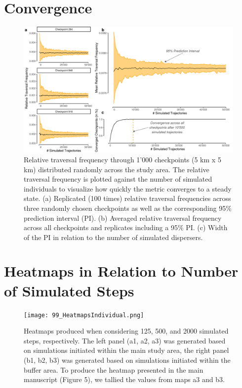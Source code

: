 \documentclass[abstract=off,10pt,a4paper,bibliography=totocnumbered]{article}
\begin{document}
\newpage
\section{Convergence}
\begin{figure}[htbp]
  \begin{center}
    \includegraphics[width=\textwidth]{99_Convergence}
    \caption{Relative traversal frequency through 1'000 checkpoints (5 km x 5
    km) distributed randomly across the study area. The relative traversal
    frequency is plotted against the number of simulated individuals to
    visualize how quickly the metric converges to a steady state. (a) Replicated
    (100 times) relative traversal frequencies across three randomly chosen
    checkpoints as well as the corresponding 95\% prediction interval (PI). (b)
    Averaged relative traversal frequency across all checkpoints and replicates
    including a 95\% PI. (c) Width of the PI in relation to the number of
    simulated dispersers.}
    \label{Convergence}
  \end{center}
\end{figure}

\newpage
{}
\section{Heatmaps in Relation to Number of Simulated Steps}
\begin{figure}[hbtp]
 \begin{center}
  \texttt{[image: 99\_HeatmapsIndividual.png]}
  \caption{Heatmaps produced when considering 125, 500, and 2000 simulated
   steps, respectively. The left panel (a1, a2, a3) was generated based on
   simulations initiated within the main study area, the right panel (b1, b2,
   b3) was generated based on simulations initiated within the buffer area. To
   produce the heatmap presented in the main manuscript (Figure 5), we tallied
   the values from maps a3 and b3.}
  \label{Heatman}
 \end{center}
\end{figure}
\restoregeometry
\end{document}
